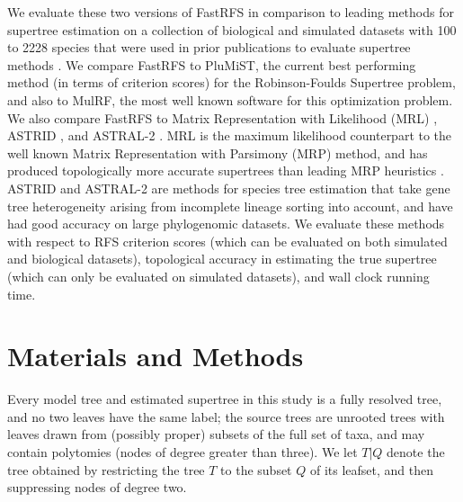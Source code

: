 We evaluate these two versions of FastRFS in comparison to 
leading methods for supertree estimation
on a collection of biological and simulated datasets
 with 100 to 2228 species
that were used in prior publications to evaluate supertree methods
\cite{smidgen,superfine,mrl}.
We compare FastRFS to 
PluMiST, the current best performing method
(in terms of criterion scores)
 for the Robinson-Foulds Supertree problem,
and also to
MulRF, the most well known software for this optimization problem.
We also compare FastRFS to 
 Matrix Representation with Likelihood (MRL) \cite{mrl},  
 ASTRID \cite{ASTRID}, and  ASTRAL-2 \cite{ASTRAL2}.
MRL is the maximum likelihood counterpart
to the well known Matrix Representation with Parsimony (MRP) method, and
has produced topologically more accurate supertrees than 
leading MRP heuristics \cite{mrl}. ASTRID and ASTRAL-2 are
methods for species tree estimation that  take 
gene tree heterogeneity arising from incomplete lineage sorting into account,
and have had good accuracy on large phylogenomic datasets.
We evaluate these methods with respect to
RFS criterion scores (which can
be evaluated on both simulated and biological datasets), 
topological accuracy in estimating the true supertree (which
can only be evaluated on simulated datasets), and wall clock running time.




\section{Materials and Methods}



Every model tree and estimated supertree in this study is a 
fully resolved tree,
and no two leaves have the same label; the source
trees are unrooted trees with leaves drawn from 
(possibly proper)
subsets of the full set of taxa, and may contain
polytomies (nodes of degree greater than three).
We let $T|Q$ denote the tree obtained by restricting the tree $T$ to the subset $Q$ of its leafset, and then suppressing nodes of degree two. 

